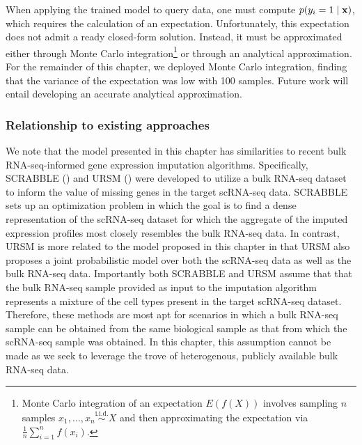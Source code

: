 When applying the trained model to query data, one must compute $p(y_i=1 \mid \bold{x})$, which requires the calculation of an expectation. Unfortunately, this expectation does not admit a ready closed-form solution.  Instead, it must be approximated either through Monte Carlo integration\footnote{Monte Carlo integration of an expectation $E(f(X))$ involves sampling $n$ samples $x_1,\dots,x_n \overset{\text{i.i.d.}}{\sim} X$ and then approximating the expectation via $\frac{1}{n}\sum_{i=1}^n f(x_i)$. } or through an analytical approximation.  For the remainder of this chapter, we deployed Monte Carlo integration, finding that the variance of the expectation was low with 100 samples.  Future work will entail developing an accurate analytical approximation.

\subsubsection{Relationship to existing approaches}

We note that the model presented in this chapter has similarities to recent bulk RNA-seq-informed gene expression imputation algorithms.  Specifically, SCRABBLE (\citealp{Peng2019}) and URSM (\citealp{Zhu2018}) were developed to utilize a bulk RNA-seq dataset to inform the value of missing genes in the target scRNA-seq data.  SCRABBLE sets up an optimization problem in which the goal is to find a dense representation of the scRNA-seq dataset for which the aggregate of the imputed expression profiles most closely resembles the bulk RNA-seq data.  In contrast, URSM is more related to the model proposed in this chapter in that URSM also proposes a joint probabilistic model over both the scRNA-seq data as well as the bulk RNA-seq data.  Importantly both SCRABBLE and URSM assume that that the bulk RNA-seq sample provided as input to the imputation algorithm represents a mixture of the cell types present in the target scRNA-seq dataset. Therefore, these methods are most apt for scenarios in which a bulk RNA-seq sample can be obtained from the same biological sample as that from which the scRNA-seq sample was obtained.  In this chapter, this assumption cannot be made as we seek to leverage the trove of heterogenous, publicly available bulk RNA-seq data.

